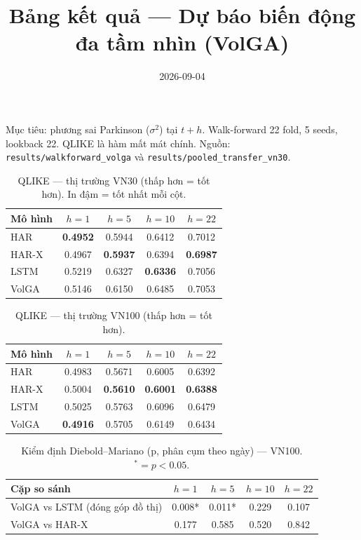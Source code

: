\documentclass[11pt]{article}
\title{Bảng kết quả --- Dự báo biến động đa tầm nhìn (VolGA)}
\author{}\date{2026-09-04}
\begin{document}
\maketitle
Mục tiêu: phương sai Parkinson ($\sigma^2$) tại $t{+}h$. Walk-forward 22 fold, 5 seeds, lookback 22.
QLIKE là hàm mất mát chính. Nguồn: \texttt{results/walkforward\_volga} và \texttt{results/pooled\_transfer\_vn30}.
\FloatBarrier

\begin{table}[h]\centering
\caption{QLIKE --- thị trường VN30 (thấp hơn = tốt hơn). In đậm = tốt nhất mỗi cột.}
\begin{tabular}{lcccc}
\toprule
Mô hình & $h{=}1$ & $h{=}5$ & $h{=}10$ & $h{=}22$ \\
\midrule
HAR & \textbf{0.4952} & 0.5944 & 0.6412 & 0.7012 \\
HAR-X & 0.4967 & \textbf{0.5937} & 0.6394 & \textbf{0.6987} \\
LSTM & 0.5219 & 0.6327 & \textbf{0.6336} & 0.7056 \\
VolGA & 0.5146 & 0.6150 & 0.6485 & 0.7053 \\
\bottomrule
\end{tabular}
\end{table}

\begin{table}[h]\centering
\caption{QLIKE --- thị trường VN100 (thấp hơn = tốt hơn).}
\begin{tabular}{lcccc}
\toprule
Mô hình & $h{=}1$ & $h{=}5$ & $h{=}10$ & $h{=}22$ \\
\midrule
HAR & 0.4983 & 0.5671 & 0.6005 & 0.6392 \\
HAR-X & 0.5004 & \textbf{0.5610} & \textbf{0.6001} & \textbf{0.6388} \\
LSTM & 0.5025 & 0.5763 & 0.6096 & 0.6479 \\
VolGA & \textbf{0.4916} & 0.5705 & 0.6149 & 0.6434 \\
\bottomrule
\end{tabular}
\end{table}

\begin{table}[h]\centering
\caption{Kiểm định Diebold--Mariano (p, phân cụm theo ngày) --- VN100. $^*=p<0.05$.}
\begin{tabular}{lcccc}
\toprule
Cặp so sánh & $h{=}1$ & $h{=}5$ & $h{=}10$ & $h{=}22$ \\
\midrule
VolGA vs LSTM (đóng góp đồ thị) & 0.008* & 0.011* & 0.229 & 0.107 \\
VolGA vs HAR-X & 0.177 & 0.585 & 0.520 & 0.842 \\
\bottomrule
\end{tabular}
\end{table}
\end{document}
